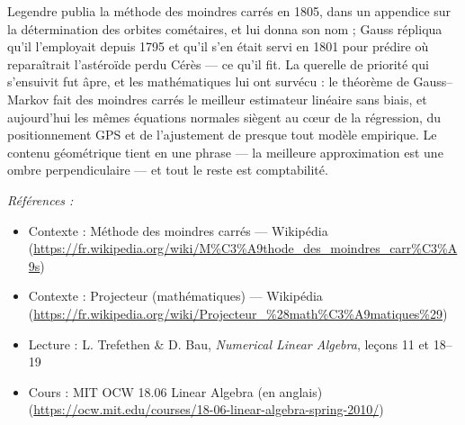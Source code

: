 \documentclass[11pt]{article}
\newenvironment{refs}{\par\small\noindent\emph{Références :}\begin{itemize}\setlength\itemsep{0pt}}{\end{itemize}\normalsize}
\begin{document}
\noindent Legendre publia la méthode des moindres carrés en 1805, dans un appendice sur la
détermination des orbites cométaires, et lui donna son nom ; Gauss répliqua qu'il l'employait depuis
1795 et qu'il s'en était servi en 1801 pour prédire où reparaîtrait l'astéroïde perdu Cérès --- ce
qu'il fit. La querelle de priorité qui s'ensuivit fut âpre, et les mathématiques lui ont survécu : le
théorème de Gauss--Markov fait des moindres carrés le meilleur estimateur linéaire sans biais, et
aujourd'hui les mêmes équations normales siègent au c\oe{}ur de la régression, du positionnement GPS et
de l'ajustement de presque tout modèle empirique. Le contenu géométrique tient en une phrase --- la
meilleure approximation est une ombre perpendiculaire --- et tout le reste est comptabilité.

\begin{refs}
\item Contexte : Méthode des moindres carrés --- Wikipédia (\url{https://fr.wikipedia.org/wiki/M%C3%A9thode_des_moindres_carr%C3%A9s})
\item Contexte : Projecteur (mathématiques) --- Wikipédia (\url{https://fr.wikipedia.org/wiki/Projecteur_%28math%C3%A9matiques%29})
\item Lecture : L. Trefethen \& D. Bau, \textit{Numerical Linear Algebra}, leçons 11 et 18--19
\item Cours : MIT OCW 18.06 Linear Algebra (en anglais) (\url{https://ocw.mit.edu/courses/18-06-linear-algebra-spring-2010/})
\end{refs}

\bigskip
\end{document}
